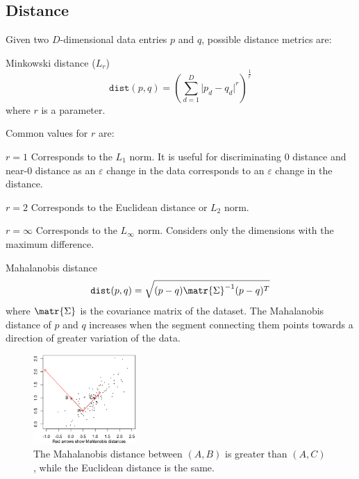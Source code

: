 \subsection{Distance}

Given two $D$-dimensional data entries $p$ and $q$, possible distance metrics are:
\begin{descriptionlist}
    \item[Minkowski distance ($L_r$)] 
        \[ \texttt{dist}(p, q) = \left( \sum_{d=1}^{D} \vert p_d - q_d \vert^r \right)^{\frac{1}{r}} \]
        where $r$ is a parameter.

        Common values for $r$ are:
        \begin{descriptionlist}
            \item[$r = 1$] 
                Corresponds to the $L_1$ norm.
                It is useful for discriminating 0 distance and near-0 distance as 
                an $\varepsilon$ change in the data corresponds to an $\varepsilon$ change in the distance.
            \item[$r = 2$]
                Corresponds to the Euclidean distance or $L_2$ norm.
            \item[$r = \infty$]
                Corresponds to the $L_\infty$ norm.
                Considers only the dimensions with the maximum difference.
        \end{descriptionlist}
    
    \item[Mahalanobis distance] 
        \[ \texttt{dist}(p, q) = \sqrt{ (p-q) \matr{\Sigma}^{-1} (p-q)^T } \]
        where $\matr{\Sigma}$ is the covariance matrix of the dataset.
        The Mahalanobis distance of $p$ and $q$ increases when the segment connecting them 
        points towards a direction of greater variation of the data.

        \begin{figure}[h]
            \centering
            \includegraphics[width=0.35\textwidth]{img/mahalanobis.png}
            \caption{The Mahalanobis distance between $(A, B)$ is greater than $(A, C)$, while the Euclidean distance is the same.}
        \end{figure}
\end{descriptionlist}

